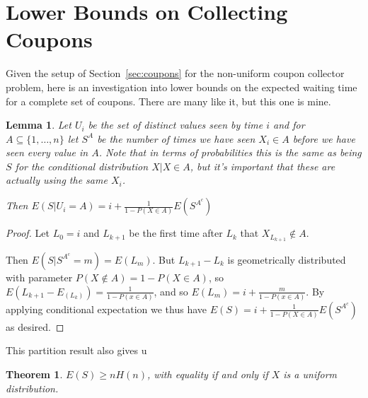 \documentclass[a4paper]{book}
\newtheorem{lemma}{Lemma}
\newtheorem{theorem}{Theorem}
\begin{document}
\section{Lower Bounds on Collecting Coupons}\label{sec:couponbounds}

Given the setup of Section~\ref{sec:coupons} for the non-uniform coupon collector problem,
here is an investigation into lower bounds on the expected waiting time for a complete set of coupons.
There are many like it, but this one is mine.

\begin{lemma}\label{lemma:couponpartition}
Let \(U_i\) be the set of distinct values seen by time \(i\) and for \(A \subseteq \{1, \ldots, n\}\) let \(S^A\) be the number of times we have seen \(X_i \in A\) before we have seen every value in \(A\).
Note that in terms of probabilities this is the same as being \(S\) for the conditional distribution \(X | X \in A\),
but it's important that these are actually using the same \(X_i\).

Then \(E(S|U_i = A) = i + \frac{1}{1 - P(X \in A)} E(S^{A^c})\)
\end{lemma}

\begin{proof}
Let \(L_0 = i\) and \(L_{k + 1}\) be the first time after \(L_k\) that \(X_{L_{k + 1}} \not\in A\).

Then \(E(S | S^{A^c} = m) = E(L_m)\).
But \(L_{k + 1} - L_{k}\) is geometrically distributed with parameter \(P(X \not\in A) = 1 - P(X \in A)\),
so \(E(L_{k + 1} - E_(L_k)) = \frac{1}{1 - P(x \in A)}\),
and so \(E(L_m) = i + \frac{m}{1 - P(x \in A)}\).
By applying conditional expectation we thus have \(E(S) = i + \frac{1}{1 - P(X \in A)} E(S^{A^c})\) as desired.
\end{proof}

This partition result also gives u

\begin{theorem}
\(E(S) \geq n H(n)\), with equality if and only if \(X\) is a uniform distribution.
\end{theorem}
\end{document}
